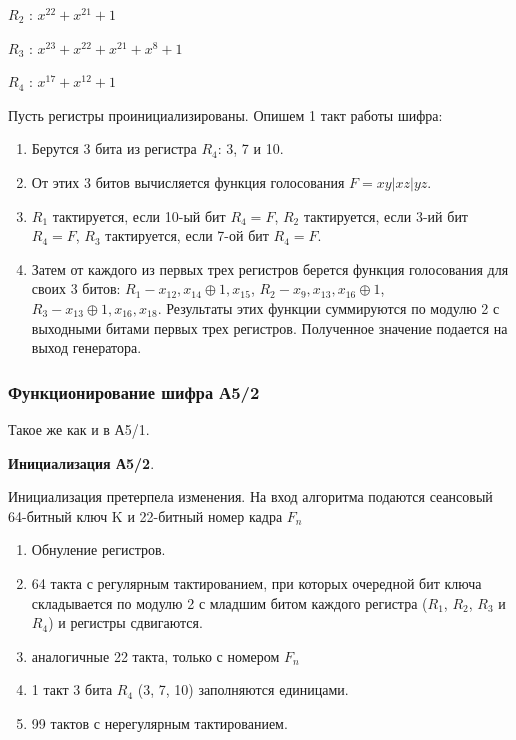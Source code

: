 \documentclass[colorthm]{./civarticle}
\begin{document}
$R_2$ : $x^{22} + x^{21} + 1$

$R_3$ : $x^{23} + x^{22} + x^{21} + x^{8} + 1$

$R_4$ : $x^{17} + x^{12} + 1$

Пусть регистры проинициализированы. Опишем 1 такт работы шифра:

\begin{enumerate}
        \item Берутся 3 бита из регистра $R_4$: 3, 7 и 10.
        \item От этих 3 битов вычисляется функция голосования $F=xy|xz|yz$.
        \item $R_1$ тактируется, если 10-ый бит $R_4 = F$, $R_2$ тактируется, если 3-ий бит $R_4 = F$, $R_3$ тактируется, если 7-ой бит $R_4 = F$.
        \item Затем от каждого из первых трех регистров берется функция голосования для своих 3 битов: $R_1 - x_{12}, x_{14} \oplus 1, x_{15}$, $R_2 - x_{9}, x_{13}, x_{16} \oplus 1$, $R_3 - x_{13} \oplus 1, x_{16}, x_{18}$. Результаты этих функции суммируются по модулю 2 с выходными битами первых трех регистров. Полученное значение подается на выход генератора.
\end{enumerate}

\subsubsection{Функционирование шифра А5/2}

Такое же как и в А5/1.

\textbf{Инициализация А5/2}.

Инициализация претерпела изменения. На вход алгоритма подаются сеансовый 64-битный ключ K и 22-битный номер кадра $F_n$

\begin{enumerate}
        \item Обнуление регистров.
        \item 64 такта с регулярным тактированием, при которых очередной бит ключа складывается по модулю 2 с младшим битом каждого регистра ($R_1$, $R_2$, $R_3$ и $R_4$) и регистры сдвигаются.
        \item аналогичные 22 такта, только с номером $F_n$
        \item 1 такт 3 бита $R_4$ (3, 7, 10) заполняются единицами.
        \item 99 тактов с нерегулярным тактированием.
\end{enumerate}
\end{document}
